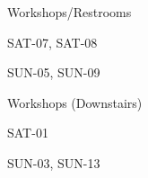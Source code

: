 \documentclass{article}
\newcommand{\room}[1]{
    \noindent
    #1
    \vspace{.2in}

}
\begin{document}
\rssheader[2in]
\vfill

\rssarrowleft[1in]

\begin{center}
    \rssbig
    \room{Workshops/Restrooms}
    \rsstiny
    \room{SAT-07, SAT-08}
    \room{SUN-05, SUN-09}
\end{center}

\vfill

\begin{minipage}{\textwidth}
    \begin{minipage}{.7\textwidth}
        \begin{center}
            \rssbig
            \room{Workshops (Downstairs)}
            \rsstiny
            \room{SAT-01}
            \room{SUN-03, SUN-13}
        \end{center}
    \end{minipage}
    \begin{minipage}{.2\textwidth}
        \begin{center}
            \rssarrowdown[1in]
        \end{center}
    \end{minipage}
\end{minipage}
\end{document}
